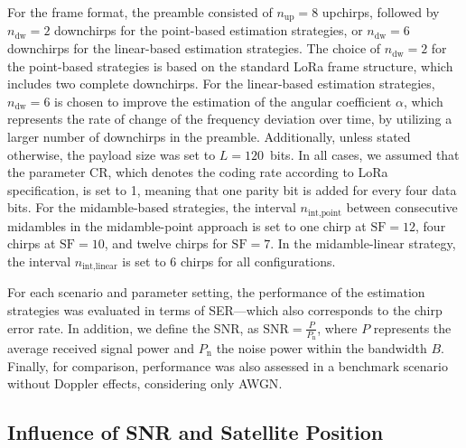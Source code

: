 \documentclass{IEEEtran}
\begin{document}
For the frame format, the preamble consisted of $n_{\text{up}}=8$ upchirps, followed by $n_{\text{dw}}=2$ downchirps for the point-based estimation strategies, or $n_{\text{dw}}=6$ downchirps for the linear-based estimation strategies. The choice of $n_{\text{dw}}=2$ for the point-based strategies is based on the standard \ac{LoRa} frame structure, which includes two complete downchirps. For the linear-based estimation strategies, $n_{\text{dw}}=6$ is chosen to improve the estimation of the angular coefficient $\alpha$, which represents the rate of change of the frequency deviation over time, by utilizing a larger number of downchirps in the preamble.  Additionally, unless stated otherwise, the payload size was set to $L=120$~bits. In all cases, we assumed that the parameter CR, which denotes the coding rate according to \ac{LoRa} specification, is set to 1, meaning that one parity bit is added for every four data bits. For the midamble-based strategies, the interval $n_{\text{int,point}}$ between consecutive midambles in the midamble-point approach is set to one chirp at $\mathrm{SF}=12$, four chirps at $\mathrm{SF}=10$, and twelve chirps for $\mathrm{SF}=7$. In the midamble-linear strategy, the interval $n_{\text{int,linear}}$ is set to 6 chirps for all configurations.

For each scenario and parameter setting, the performance of the estimation strategies was evaluated in terms of \ac{SER}---which also corresponds to the chirp error rate.  In addition, we define the \ac{SNR}, as $\text{SNR}=\frac{P}{P_\text{n}}$, where $P$ represents the average received signal power and $P_\text{n}$ the noise power within the bandwidth $B$. Finally, for comparison, performance was also assessed in a benchmark scenario without Doppler effects, considering only \ac{AWGN}.

\subsection{Influence of SNR and Satellite Position}
\end{document}
